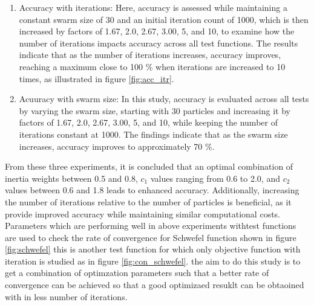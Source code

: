 \documentclass[paper,revised]{geophysics}
\begin{document}
\begin{enumerate}
	\item Accuracy with iterations: Here, accuracy is assessed while maintaining a constant swarm size of 30 and an initial iteration count of 1000, which is then increased by factors of 1.67, 2.0, 2.67, 3.00, 5, and 10, to examine how the number of iterations impacts accuracy across all test functions. The results indicate that as the number of iterations increases, accuracy improves, reaching a maximum close to 100 \% when iterations are increased to 10 times, as illustrated in figure \ref{fig:acc_itr}.
	
	\item Acuuracy with swarm size: In this study, accuracy is evaluated across all tests by varying the swarm size, starting with 30 particles and increasing it by factors of 1.67, 2.0, 2.67, 3.00, 5, and 10, while keeping the number of iterations constant at 1000. The findings indicate that as the swarm size increases, accuracy improves to approximately 70 \%.
\end{enumerate}
From these three experiments, it is concluded that an optimal combination of inertia weights between 0.5 and 0.8, \(c_1\) values ranging from 0.6 to 2.0, and \(c_2\) values between 0.6 and 1.8 leads to enhanced accuracy. Additionally, increasing the number of iterations relative to the number of particles is beneficial, as it provide improved accuracy while maintaining similar computational costs.
\\
Parameters which are performing well in above experiments withtest functions are used to check the rate of convergence for Schwefel function shown in figure \ref{fig:schwefel} this is another test function for which only objective function with iteration is studied as in figure \ref{fig:con_schwefel}. the aim to do this study is to get a combination of optimzation parameters such that a better rate of convergence can be achieved so that a good optimizaed resuklt can be obtaoined with in less number of iterations.

\end{document}
